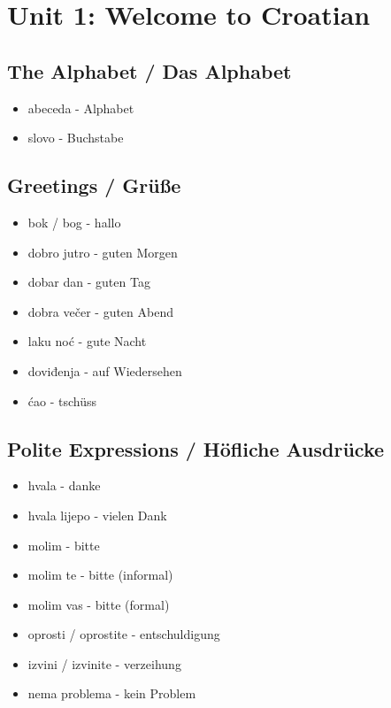 
\section{Unit 1: Welcome to Croatian}

\subsection*{The Alphabet / Das Alphabet}
\begin{itemize}
    \item abeceda - Alphabet
    \item slovo - Buchstabe
\end{itemize}

\subsection*{Greetings / Grüße}
\begin{itemize}
    \item bok / bog - hallo
    \item dobro jutro - guten Morgen
    \item dobar dan - guten Tag
    \item dobra večer - guten Abend
    \item laku noć - gute Nacht
    \item doviđenja - auf Wiedersehen
    \item ćao - tschüss
\end{itemize}

\subsection*{Polite Expressions / Höfliche Ausdrücke}
\begin{itemize}
    \item hvala - danke
    \item hvala lijepo - vielen Dank
    \item molim - bitte
    \item molim te - bitte (informal)
    \item molim vas - bitte (formal)
    \item oprosti / oprostite - entschuldigung
    \item izvini / izvinite - verzeihung
    \item nema problema - kein Problem
\end{itemize}

